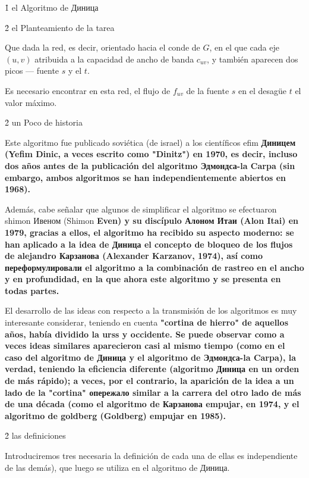 \h1{ el Algoritmo de Диница }



\h2{ el Planteamiento de la tarea }

Que dada la red, es decir, orientado hacia el conde de $G$, en el que cada eje $(u,v)$ atribuida a la capacidad de ancho de banda $c_{uv}$, y también aparecen dos picos --- fuente $s$ y el $t$.

Es necesario encontrar en esta red, el flujo de $f_{uv}$ de la fuente $s$ en el desagüe $t$ el valor máximo.



\h2{ un Poco de historia }

Este algoritmo fue publicado soviética (de israel) a los científicos efim \bf{Диницем} (Yefim Dinic, a veces escrito como "Dinitz") en 1970, es decir, incluso dos años antes de la publicación del algoritmo Эдмондса-la Carpa (sin embargo, ambos algoritmos se han independientemente abiertos en 1968).

Además, cabe señalar que algunos de simplificar el algoritmo se efectuaron shimon Ивеном (Shimon \bf{Even}) y su discípulo Алоном Итаи (Alon \bf{Itai}) en 1979, gracias a ellos, el algoritmo ha recibido su aspecto moderno: se han aplicado a la idea de Диница el concepto de bloqueo de los flujos de alejandro Карзанова (Alexander Karzanov, 1974), así como переформулировали el algoritmo a la combinación de rastreo en el ancho y en profundidad, en la que ahora este algoritmo y se presenta en todas partes.

El desarrollo de las ideas con respecto a la transmisión de los algoritmos es muy interesante considerar, teniendo en cuenta \bf{"cortina de hierro"} de aquellos años, había dividido la urss y occidente. Se puede observar como a veces ideas similares aparecieron casi al mismo tiempo (como en el caso del algoritmo de Диница y el algoritmo de Эдмондса-la Carpa), la verdad, teniendo la eficiencia diferente (algoritmo Диница en un orden de más rápido); a veces, por el contrario, la aparición de la idea a un lado de la "cortina" опережало similar a la carrera del otro lado de más de una década (como el algoritmo de Карзанова empujar, en 1974, y el algoritmo de goldberg (Goldberg) empujar en 1985).



\h2{ las definiciones }

Introduciremos tres necesaria la definición de cada una de ellas es independiente de las demás), que luego se utiliza en el algoritmo de Диница.

